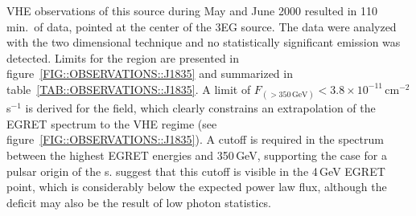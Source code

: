 VHE observations of this source during May and June 2000 resulted in
110\,min.\ of data, pointed at the center of the 3EG source. The data
were analyzed with the two dimensional technique and no statistically
significant emission was detected. Limits for the region are presented
in figure~\ref{FIG::OBSERVATIONS::J1835} and summarized in
table~\ref{TAB::OBSERVATIONS::J1835}. A limit of
$F_{(>350\,\mathrm{GeV})}<3.8\times10^{-11}$\,cm$^{-2}$\,s$^{-1}$ is
derived for the field, which clearly constrains an extrapolation of
the EGRET spectrum to the VHE regime (see
figure~\ref{FIG::OBSERVATIONS::J1835}). A cutoff is required in the
spectrum between the highest EGRET energies and 350\,GeV, supporting
the case for a pulsar origin of the {\Grayc}s.
\citet{REF::HALPERN::APJ2002} suggest that this cutoff is visible in the
4\,GeV EGRET point, which is considerably below the expected power law
flux, although the deficit may also be the result of low photon
statistics.

